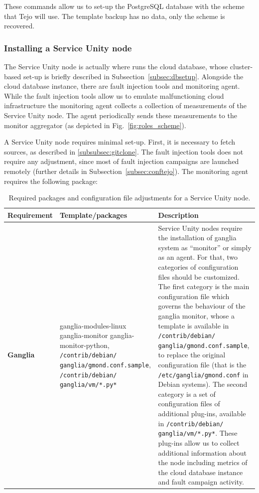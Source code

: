These commands allow us to set-up the PostgreSQL database with the scheme that Tejo will use. The template backup has no data, only the scheme is recovered.


\subsubsection{Installing a Service Unity node}
\label{subsubsec:su}

The Service Unity node is actually where runs the cloud database, whose cluster-based set-up is briefly described in Subsection~\ref{subsec:dbsetup}. Alongside the cloud database instance, there are fault injection tools and monitoring agent. While the fault injection tools allow us to emulate malfunctioning cloud infrastructure the monitoring agent collects a collection of measurements of the Service Unity node. The agent periodically sends these measurements to the monitor aggregator (as depicted in Fig.~\ref{fig:roles_scheme}). 

A Service Unity node requires minimal set-up. First, it is necessary to fetch sources, as described in \ref{subsubsec:gitclone}. The fault injection tools does not require any adjustment, since most of fault injection campaigns are launched remotely (further details in Subsection~\ref{subsec:conftejo}). The monitoring agent requires the following package:

			\begin{table}[htdp]
				\begin{center}
\caption{Required packages and configuration file adjustments for a Service Unity node.}
  \label{tab:common_install_conf}
					\begin{tabular}{R{2.5cm} || L{4.5cm} L{6cm} }
						{\bf Requirement}&{\bf Template/packages}&{\bf Description} \\  
						\hline
						\hline
						{\bf Ganglia}&ganglia-modules-linux ganglia-monitor ganglia-monitor-python, \verb|/contrib/debian/| \verb|ganglia/gmond.conf.sample|, \verb|/contrib/debian/| \verb|ganglia/vm/*.py*| & Service Unity nodes require the installation of ganglia system as ``monitor'' or simply as an agent. For that, two categories of configuration files should be customized. The first category is the main configuration file which governs the behaviour of the ganglia monitor, whose a template is available in \verb|/contrib/debian/| \verb|ganglia/gmond.conf.sample|, to replace the original configuration file (that is the \verb|/etc/ganglia/gmond.conf| in Debian systems). The second category is a set of configuration files of additional plug-ins, available in \verb|/contrib/debian/| \verb|ganglia/vm/*.py*|. These plug-ins allow us to collect additional information about the node including metrics of the cloud database instance and fault campaign activity.\\
					\end{tabular}
				\end{center}
			\end{table}


